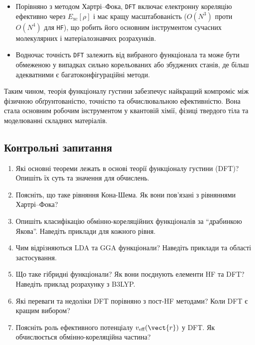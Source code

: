 \begin{itemize}
    \item Порівняно з методом Хартрі--Фока, \texttt{DFT} включає електронну кореляцію ефективно через $E_\mathrm{xc}[\rho]$
    і має кращу масштабованість ($O(N^3)$ проти $O(N^4)$ для \texttt{HF}), що робить його основним інструментом
    сучасних молекулярних і матеріалознавчих розрахунків.

    \item Водночас точність \texttt{DFT} залежить від вибраного функціонала та може бути обмеженою
    у випадках сильно корельованих або збуджених станів, де більш адекватними є багатоконфігураційні методи.
\end{itemize}

Таким чином, теорія функціоналу густини забезпечує найкращий компроміс
між фізичною обґрунтованістю, точністю та обчислювальною ефективністю.
Вона стала основним робочим інструментом у квантовій хімії, фізиці твердого тіла
та моделюванні складних матеріалів.



\subsection*{Контрольні запитання}

\begin{enumerate}
	\item Які основні теореми лежать в основі теорії функціоналу густини (DFT)? Опишіть їх суть та значення для обчислень.
	\item Поясніть, що таке рівняння Кона-Шема. Як вони пов'язані з рівняннями Хартрі--Фока?
	\item Опишіть класифікацію обмінно-кореляційних функціоналів за ``драбинкою Якова''. Наведіть приклади для кожного рівня.
	\item Чим відрізняються LDA та GGA функціонали? Наведіть приклади та області застосування.
	\item Що таке гібридні функціонали? Як вони поєднують елементи HF та DFT? Наведіть приклад розрахунку з B3LYP.
	\item Які переваги та недоліки DFT порівняно з пост-HF методами? Коли DFT є кращим вибором?
	\item Поясніть роль ефективного потенціалу $v_{\text{eff}}(\vect{r})$ у DFT. Як обчислюється обмінно-кореляційна частина?
\end{enumerate}

